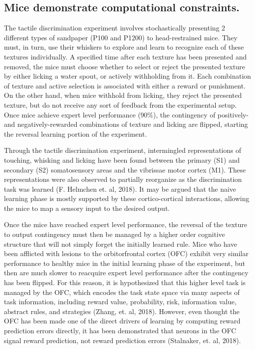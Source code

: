 \documentclass[11pt]{article}
\begin{document}
\subsection{Mice demonstrate computational constraints.}

The tactile discrimination experiment involves stochastically presenting 2 different types of sandpaper (P100 and P1200) to head-restrained mice.  They must, in turn, use their whiskers to explore and learn to recognize each of these textures individually.  A specified time after each texture has been presented and removed, the mice must choose whether to select or reject the presented texture by either licking a water spout, or actively withholding from it.  Each combination of texture and active selection is associated with either a reward or punishment.  On the other hand, when mice withhold from licking, they reject the presented texture, but do not receive any sort of feedback from the experimental setup.  Once mice achieve expert level performance (90\%), the contingency of positively- and negatively-rewarded combinations of texture and licking are flipped, starting the reversal learning portion of the experiment.

Through the tactile discrimination experiment, intermingled representations of touching, whisking and licking have been found between the primary (S1) and secondary (S2) somatosensory areas and the vibrissae motor cortex (M1).  These representations were also observed to partially reorganize as the discrimination task was learned (F. Helmchen et. al, 2018).  It may be argued that the naive learning phase is mostly supported by these cortico-cortical interactions, allowing the mice to map a sensory input to the desired output.

Once the mice have reached expert level performance, the reversal of the texture to output contingency must then be managed by a higher order cognitive structure that will not simply forget the initially learned rule.  Mice who have been afflicted with lesions to the orbitorfrontal cortex (OFC) exhibit very similar performance to healthy mice in the initial learning phase of the experiment, but then are much slower to reacquire expert level performance after the contingency has been flipped.  For this reason, it is hypothesized that this higher level task is managed by the OFC, which encodes the task state space via many aspects of task information, including reward value, probability, risk, information value, abstract rules, and strategies (Zhang, et. al, 2018).  However, even thought the OFC has been made one of the direct drivers of learning by computing reward prediction errors directly, it has been demonstrated that neurons in the OFC signal reward prediction, not reward prediction errors (Stalnaker, et. al, 2018).
\end{document}
